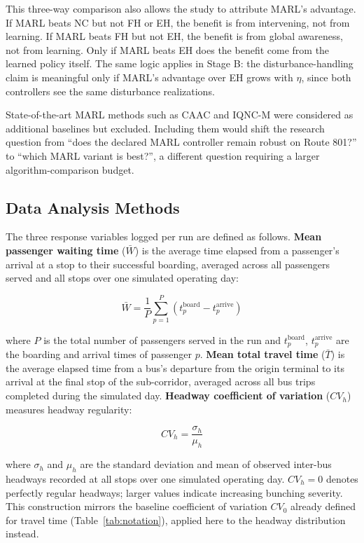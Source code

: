 This three-way comparison also allows the study to attribute MARL's advantage. If MARL beats NC but not FH or EH, the benefit is from intervening, not from learning. If MARL beats FH but not EH, the benefit is from global awareness, not from learning. Only if MARL beats EH does the benefit come from the learned policy itself. The same logic applies in Stage B: the disturbance-handling claim is meaningful only if MARL's advantage over EH grows with $\eta$, since both controllers see the same disturbance realizations.

State-of-the-art MARL methods such as CAAC and IQNC-M \cite{Wangsun} were considered as additional baselines but excluded. Including them would shift the research question from ``does the declared MARL controller remain robust on Route 801?'' to ``which MARL variant is best?'', a different question requiring a larger algorithm-comparison budget.

\subsection{Data Analysis Methods}

The three response variables logged per run are defined as follows. \textbf{Mean passenger waiting time} ($\bar{W}$) is the average time elapsed from a passenger's arrival at a stop to their successful boarding, averaged across all passengers served and all stops over one simulated operating day:

\begin{equation}
\bar{W} = \frac{1}{P} \sum_{p=1}^{P} \left(t_p^{\text{board}} - t_p^{\text{arrive}}\right)
\label{eq:waiting_time}
\end{equation}

where $P$ is the total number of passengers served in the run and $t_p^{\text{board}}$, $t_p^{\text{arrive}}$ are the boarding and arrival times of passenger $p$. \textbf{Mean total travel time} ($\bar{T}$) is the average elapsed time from a bus's departure from the origin terminal to its arrival at the final stop of the sub-corridor, averaged across all bus trips completed during the simulated day. \textbf{Headway coefficient of variation} ($CV_h$) measures headway regularity:

\begin{equation}
CV_h = \frac{\sigma_h}{\mu_h}
\label{eq:headway_cv}
\end{equation}

where $\sigma_h$ and $\mu_h$ are the standard deviation and mean of observed inter-bus headways recorded at all stops over one simulated operating day. $CV_h = 0$ denotes perfectly regular headways; larger values indicate increasing bunching severity. This construction mirrors the baseline coefficient of variation $CV_0$ already defined for travel time (Table~\ref{tab:notation}), applied here to the headway distribution instead.

